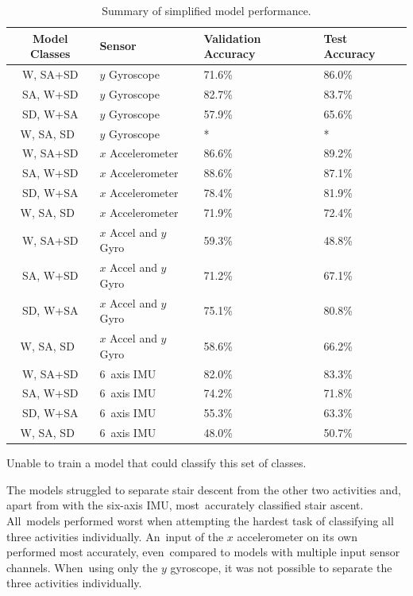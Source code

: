 \begin{table}[!hbt]
    \centering
    \caption{Summary of simplified model performance.}
    \label{tab:simplified_model_perfomances}
  
\begin{tabularx}{\textwidth}{cYYY}
\toprule
        \textbf{Model Classes} & \textbf{Sensor} & \textbf{Validation Accuracy} & \textbf{Test Accuracy}\\
        \midrule
        W, SA+SD & $y$ Gyroscope & 71.6\% & 86.0\% \\
        SA, W+SD & $y$ Gyroscope & 82.7\% & 83.7\% \\
        SD, W+SA & $y$ Gyroscope & 57.9\% & 65.6\% \\
        W, SA, SD~& $y$ Gyroscope & * & * \\
        W, SA+SD & $x$ Accelerometer & 86.6\% & 89.2\% \\
        SA, W+SD & $x$ Accelerometer & 88.6\% & 87.1\% \\
        SD, W+SA & $x$ Accelerometer & 78.4\% & 81.9\% \\
        W, SA, SD~& $x$ Accelerometer & 71.9\% & 72.4\%\\
        W, SA+SD & $x$ Accel and $y$ Gyro & 59.3\% & 48.8\% \\
        SA, W+SD & $x$ Accel and $y$ Gyro & 71.2\% & 67.1\% \\
        SD, W+SA & $x$ Accel and $y$ Gyro & 75.1\% & 80.8\% \\
        W, SA, SD~& $x$ Accel and $y$ Gyro & 58.6\% & 66.2\%\\
        W, SA+SD & 6~axis IMU & 82.0\% & 83.3\% \\
        SA, W+SD & 6~axis IMU & 74.2\% & 71.8\% \\
        SD, W+SA & 6~axis IMU & 55.3\% & 63.3\% \\
        W, SA, SD~& 6~axis IMU & 48.0\% & 50.7\%\\
\bottomrule
\end{tabularx}

\footnotesize * Unable to train a model that could classify this set of classes.
       
\end{table}


The models struggled to separate stair descent from the other two activities and, apart from with the six-axis IMU, most~accurately classified stair ascent. All~models performed worst when attempting the hardest task of classifying all three activities individually. An~input of the $x$ accelerometer on its own performed most accurately, even~compared to models with multiple input sensor channels. When~using only the $y$ gyroscope, it was not possible to separate the three activities individually.

